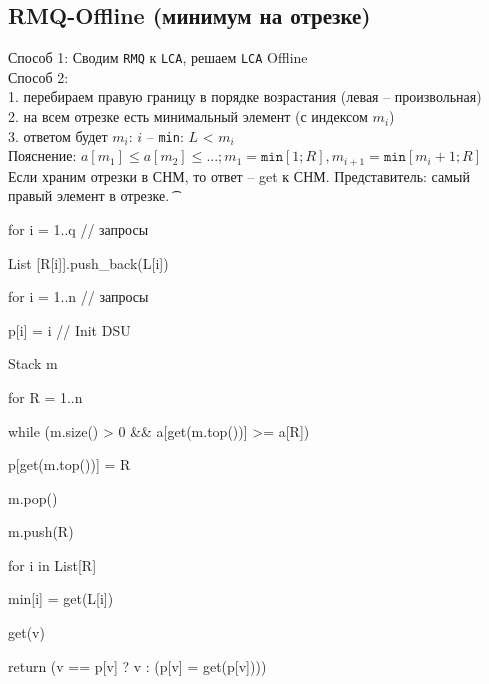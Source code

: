   \subsection{RMQ-Offline (минимум на отрезке)}
	Способ 1: Сводим \texttt{RMQ} к \texttt{LCA}, решаем \texttt{LCA} Offline \\ 
	Способ 2: \\ 
		1. перебираем правую границу в порядке возрастания (левая – произвольная) \\
		2. на всем отрезке есть минимальный элемент (с индексом $m_i$) \\
		3. ответом будет $m_i$: $i$ – \texttt{min}: $L$ < $m_i$ \\ 
	Пояснение:   $a[m_1] \le a[m_2] \le ...; m_1 = \texttt{min}[1; R], m_{i+1} = \texttt{min}[m_i + 1; R]$ \\
	Если храним отрезки в СНМ, то ответ – get к СНМ. Представитель: самый правый элемент в отрезке.
	 \t{\begin{MyList}
         \item \hspace{0em} for i = 1..q // запросы 
          \item \hspace{2em} List [R[i]].push\_back(L[i])
          \item \hspace{0em} for i = 1..n // запросы
          \item \hspace{2em} p[i] = i // Init DSU
          \item \hspace{0em} Stack m
          \item \hspace{0em} for R = 1..n
          \item \hspace{2em} while (m.size() > 0 \&\&  a[get(m.top())] >= a[R])
          \item \hspace{4em} p[get(m.top())] = R
          \item \hspace{4em} m.pop()
          \item \hspace{2em} m.push(R)
          \item \hspace{2em} for i in List[R]
          \item \hspace{4em} min[i] = get(L[i])
	\item \hspace{0em} 
          \item \hspace{0em} get(v)
          \item \hspace{2em} return (v == p[v] ? v : (p[v] = get(p[v])))
        \end{MyList}}

